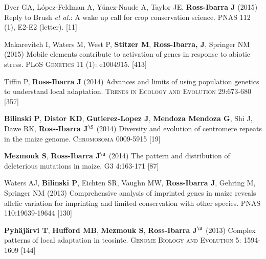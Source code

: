 \documentclass[letterpaper,10pt]{article}
\begin{document}
\begin{etaremune}
\item Dyer GA, L\'opez-Feldman A, Y\'unez-Naude A, Taylor JE, {\bf Ross-Ibarra J} (2015) Reply to Brush \emph{et al.}: A wake up call for crop conservation science. PNAS 112 (1), E2-E2 (letter).
 [11]\\


\item Makarevitch I, Waters M, West P, {\bf Stitzer M}, {\bf Ross-Ibarra, J}, Springer NM (2015) Mobile elements contribute to activation of genes in response to abiotic stress. \textsc{PLoS Genetics} 11 (1): e1004915. %
 [413]\\


\item Tiffin P, {\bf Ross-Ibarra J} (2014) Advances and limits of using population genetics to understand local adaptation. \textsc{Trends in Ecology and Evolution} 29:673-680 %
 [357]\\


\item {\bf Bilinski P}, {\bf Distor KD}, {\bf Gutierez-Lopez J}, {\bf Mendoza Mendoza G}, Shi J, Dawe RK,  {\bf Ross-Ibarra J}$^\S$ (2014) Diversity and evolution of centromere repeats in the maize genome. \textsc{Chromosoma} 0009-5915
 [19]\\

\item {\bf Mezmouk S}, {\bf Ross-Ibarra J}$^\S$ (2014) The pattern and distribution of deleterious mutations in maize. \textsc{G3} 4:163-171
 [87]\\

\item Waters AJ, {\bf Bilinski P}, Eichten SR, Vaughn MW, {\bf Ross-Ibarra J}, Gehring M, Springer NM (2013) Comprehensive analysis of imprinted genes in maize reveals allelic variation for imprinting and limited conservation with other species. \textsc{PNAS} 110:19639-19644
 [130]\\


\item {\bf Pyh\"aj\"arvi T}, {\bf Hufford MB}, {\bf Mezmouk S}, {\bf Ross-Ibarra J}$^\S$ (2013) Complex patterns of local adaptation in teosinte. \textsc{Genome Biology and Evolution} 5: 1594-1609 %
 [144]\\



\end{etaremune}
\end{document}
